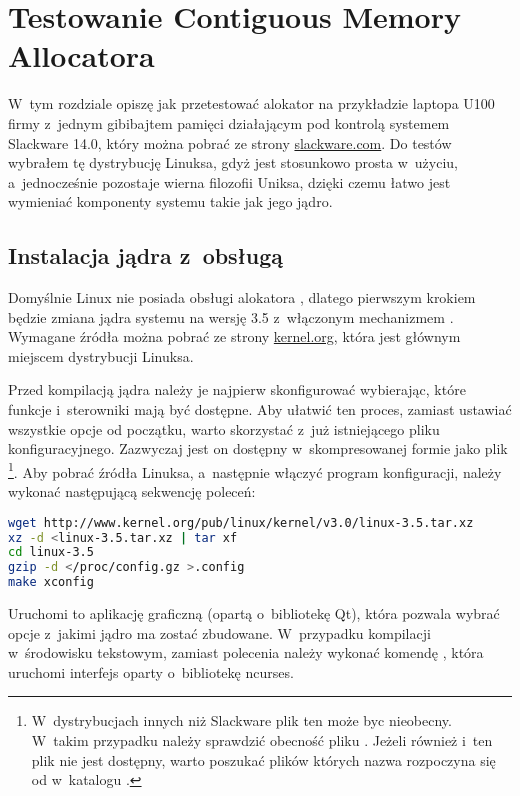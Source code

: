 \chapter{Testowanie Contiguous Memory Allocatora}

W~tym rozdziale opiszę jak przetestować alokator  na
przykładzie laptopa U100 firmy  z~jednym gibibajtem pamięci
 działającym pod kontrolą systemem Slackware 14.0, który
można pobrać ze strony \href{http://slackware.com/}{\ttfamily
  slackware.com}.  Do testów wybrałem tę dystrybucję Linuksa, gdyż
jest stosunkowo prosta w~użyciu, a~jednocześnie pozostaje wierna
filozofii Uniksa, dzięki czemu łatwo jest wymieniać komponenty systemu
takie jak jego jądro.


\section{Instalacja jądra z~obsługą }

Domyślnie Linux nie posiada obsługi alokatora , dlatego
pierwszym krokiem będzie zmiana jądra systemu na wersję 3.5
z~włączonym mechanizmem .  Wymagane źródła można pobrać ze
strony \href{http://kernel.org/}{\ttfamily kernel.org}, która jest
głównym miejscem dystrybucji Linuksa.

Przed kompilacją jądra należy je najpierw skonfigurować wybierając,
które funkcje i~sterowniki mają być dostępne.  Aby ułatwić ten proces,
zamiast ustawiać wszystkie opcje od początku, warto skorzystać z~już
istniejącego pliku konfiguracyjnego.  Zazwyczaj jest on dostępny
w~skompresowanej formie jako plik
\footnote{W~dystrybucjach innych niż Slackware
  plik ten może byc nieobecny.  W~takim przypadku należy sprawdzić
  obecność pliku .  Jeżeli również i~ten plik nie
  jest dostępny, warto poszukać plików których nazwa rozpoczyna się od
   w~katalogu .}.  Aby pobrać źródła Linuksa,
a~następnie włączyć program konfiguracji, należy wykonać następującą
sekwencję poleceń:

\begin{lstlisting}[language=sh,numbers=none,columns=fullflexible]
wget http://www.kernel.org/pub/linux/kernel/v3.0/linux-3.5.tar.xz
xz -d <linux-3.5.tar.xz | tar xf
cd linux-3.5
gzip -d </proc/config.gz >.config
make xconfig
\end{lstlisting}

Uruchomi to aplikację graficzną (opartą o~bibliotekę Qt), która
pozwala wybrać opcje z~jakimi jądro ma zostać zbudowane.  W~przypadku
kompilacji w~środowisku tekstowym, zamiast polecenia
 należy wykonać komendę , która
uruchomi interfejs oparty o~bibliotekę ncurses.

